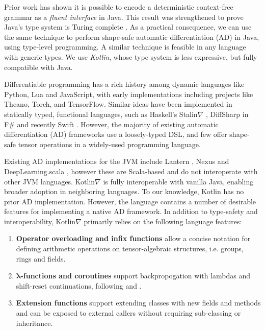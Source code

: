 \documentclass[12pt,initial,twoside,maitrise]{dms}
\numberwithin{equation}{section}
\numberwithin{table}{chapter}
\numberwithin{figure}{chapter}
\begin{document}
    Prior work has shown it is possible to encode a deterministic context-free grammar as a \textit{fluent interface} \cite{gil2016formal} in Java. This result was strengthened to prove Java's type system is Turing complete \cite{Grigore:2017:JGT:3009837.3009871}. As a practical consequence, we can use the same technique to perform shape-safe automatic differentiation (AD) in Java, using type-level programming. A similar technique is feasible in any language with generic types. We use \textit{Kotlin}, whose type system is less expressive, but fully compatible with Java.

Differentiable programming has a rich history among dynamic languages like Python, Lua and JavaScript, with early implementations including projects like Theano, Torch, and TensorFlow. Similar ideas have been implemented in statically typed, functional languages, such as Haskell's Stalin$\nabla$ \cite{pearlmutter2008using}, DiffSharp in F\# \cite{DBLP:journalscorrBaydinPS15} and recently Swift \cite{swift}. However, the majority of existing automatic differentiation (AD) frameworks use a loosely-typed DSL, and few offer shape-safe tensor operations in a widely-used programming language.

Existing AD implementations for the JVM include Lantern \cite{DBLP:journalscorrabs-1803-10228}, Nexus \cite{chen2017typesafe} and DeepLearning.scala \cite{dl4s}, however these are Scala-based and do not interoperate with other JVM languages. Kotlin$\nabla$ is fully interoperable with vanilla Java, enabling broader adoption in neighboring languages. To our knowledge, Kotlin has no prior AD implementation. However, the language contains a number of desirable features for implementing a native AD framework. In addition to type-safety and interoperability, Kotlin$\nabla$ primarily relies on the following language features:

\begin{enumerate}[itemsep=-0.5ex]
  \item \textbf{Operator overloading and infix functions} allow a concise notation for defining arithmetic operations on tensor-algebraic structures, i.e. groups, rings and fields.
  \item \textbf{$\mathbf{\lambda}$-functions and coroutines} support backpropogation with lambdas and shift-reset continuations, following \cite{pearlmutter2008reverse} and \cite{DBLP:journalscorrabs-1803-10228}.
  \item \textbf{Extension functions} support extending classes with new fields and methods and can be exposed to external callers without requiring sub-classing or inheritance.
\end{enumerate}
\end{document}

